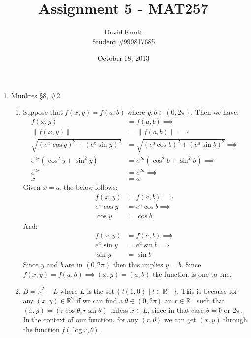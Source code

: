 \documentclass[letterpaper,10pt]{article}
\begin{document}
\title{Assignment 5 - MAT257}
\author{David Knott \\  Student \#999817685}
\date{October 18, 2013}
\maketitle
\begin{enumerate}

	\item Munkres \S8, \#2
	\begin{enumerate}
		\item Suppose that $f(x,y) = f(a,b)$ where $y,b \in (0, 2\pi)$. Then we have:
		\begin{align*}
		f(x,y) &= f(a,b) \implies \\
		\|f(x,y)\| &= \|f(a,b)\| \implies \\
		\sqrt{(e^x \cos y)^2 + (e^x \sin y)^2} & = \sqrt{(e^a \cos b)^2 + (e^a \sin b)^2} \implies \\
		e^{2x} (\cos^2 y + \sin^2 y) & = e^{2a} (\cos^2 b + \sin^2 b) \implies \\
		e^{2x} & = e^{2a} \implies \\
		x & = a
		\end{align*}
		Given $x = a$, the below follows:
		\begin{align*}
		f(x,y) &= f(a,b) \implies \\
		e^x \cos y &= e^a \cos b \implies \\
		\cos y &= \cos b 
		\end{align*}
		And:
		\begin{align*}
		f(x,y) &= f(a,b) \implies \\
		e^x \sin y &= e^a \sin b \implies \\
		\sin y &= \sin b
		\end{align*}
		Since $y$ and $b$ are in $(0, 2\pi)$ then this implies $y = b$. Since $f(x,y) = f(a,b) \implies (x, y) = (a, b)$ the function is one to one.

		\item $B = \mathbb{R}^2 - L$ where $L$ is the set $\{\; t(1,0) \;\big|\; t \in \mathbb{R}^{+} \;\}$.
		This is because for any $(x,y) \in \mathbb{R}^2$ if we can find a $\theta \in (0, 2\pi)$ an $r \in \mathbb{R}^{+}$ such that $(x, y) = (r \cos \theta, r \sin \theta)$ unless $x \in L$, since in that case $\theta = 0$ or $2\pi$. In the context of our function, for any $(r, \theta)$ we can get $(x, y)$ through the function $f(\log r, \theta)$. 


\end{enumerate}
\end{enumerate}
\end{document}

